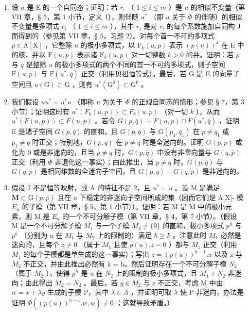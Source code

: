 \begin{enumerate}
\def\labelenumi{\alph{enumi})}
\item
  设 \(u\) 是 E 的一个自同态；证明：若 \(r_i\) （ \(1 \leqslant i \leqslant m\) ）是 \(u\) 的相似不变量（第 VII 章，§ 5，第 1 小节，定义 1），则伴随 \(u^*\) （即 \(u\) 关于 \(\Phi\) 的伴随）的相似不变量是多项式 \(\bar{r}_i\) （ \(1 \leqslant i \leqslant m\) ），其中 \(\bar{r}_i\) 是对 \(r_i\) 的每个系数施加自同构 J 而得到的（参见第 VII 章，§ 5，习题 2）。对每个首一不可约多项式 \(p \in \mathrm{A}[\mathrm{X}]\) ，它整除 \(u\) 的极小多项式，以 \(\mathrm{F}_k(u, p)\) 表示 \((p(u))^k\) 在 E 中的核，并以 \(\mathrm{F}(u, p)\) 表示诸 \(\mathrm{F}_k(u, p)\) 对一切整数 \(k > 0\) 的并。证明：若 \(p\) 与 \(q\) 是整除 \(u\) 的极小多项式的两个不同的首一不可约多项式，则子空间 \(\mathrm{F}(u, p)\) 与 \(\mathrm{F}(u^*, \bar{q})\) 正交（利用贝祖恒等式）。最后，若 G 是 E 的向量子空间且 \(u(\mathrm{G}) \subset \mathrm{G}\) ，则有 \(u^*(\mathrm{G}^0) \subset \mathrm{G}^0\) 。
\item
  我们假设 \(uu^{*} = u^{*}u\) （即称 \(u\) 为关于 \(\Phi\) 的正规自同态的情形；参见 § 7，第 3 小节）；证明这时有 \(u^{*}(F_{k}(u,p)) \subset F_{k}(u,p)\) （对一切 \(k\) ），从而 \(u^{*}(F(u,p)) \subset F(u,p)\) 。若令 \(G(p,\bar{q}) = F(u,p) \cap F(u^{*},\bar{q})\) ，证明 E 是诸子空间 \(G(p,\bar{q})\) 的直和，且 \(G(p,\bar{q})\) 与 \(G(p_{1},\bar{q}_{1})\) 在 \(p \neq q_{1}\) 或 \(p_{1} \neq q\) 时正交；特别地，\(G(p,\bar{q})\) 在 \(p \neq q\) 时是全迷向的。证明 \(G(p,\bar{p})\) 或化为 0 或是非迷向的，且当 \(p \neq q\) 时，\(G(p,\bar{q})\) 中没有非零向量与 \(G(q,\bar{p})\) 正交（利用 \(\Phi\) 非退化这一事实）；由此推出，当 \(p \neq q\) 时，\(G(p,\bar{q})\) 与 \(G(q,\bar{p})\) 是相同维数的全迷向子空间，且 \(G(p,\bar{q}) + G(q,\bar{p})\) 是非迷向的。
\item
  假设 J 不是恒等映射，或 A 的特征不是 2，且 \(u^{*} = u\) 。设 M 是满足 \(\mathbf{M} \subset \mathrm{G}(p, \overline{p})\) 且在 \(u\) 下稳定的非迷向子空间所成的集（因而它们是 A{[}X{]}- 模 \(E_{u}\) 的子模（第 VII 章，§ 5，第 1 小节））。证明：若 M 是 M 中的极小元素，则 M 是 \(E_{u}\) 的一个不可分解子模（第 VII 章，§ 4，第 7 小节）。（假设 M 是一个不可分解子模 \(M_{1}\) 与一个子模 \(M_{2} \neq \{0\}\) 的直和，极小多项式 \(p^{h}\) 与 \(p^{k}\) （分别为 u 在 \(M_{1}\) 与 \(M_{2}\) 上的限制的）满足 \(h \geqslant k\) 。注意此时 \(M_{1}\) 必然是迷向的，且每个 \(z \neq 0\) （属于 \(M_{1}\) 且使 \(p(u).z = 0\) ）都与 \(M_{1}\) 正交（利用 \(M_{1}\) 的每个子模都是单生成的这一事实）；写出 \(z = (p(u))^{h-1}.x\) 以及 z 与 \(M_{2}\) 不正交，并由此推出必然有 k = h。然后证明存在一个不可分解子模 \(N_{2}\) （属于 \(M_{2}\) ），使得 \(p^{h}\) 是 u 在 \(N_{2}\) 上的限制的极小多项式，且 \(M_{1} + N_{2}\) 非迷向；由此得出 \(M_{2} = N_{2}\) 。最后，若 \(y \in M_{2}\) 与 z 不正交，考虑 M 中由 \(w = x + \lambda y\) 生成的子模 P，其中 \(\lambda \in A\) ，并证明可取 \(\lambda\) 使 P 非迷向，办法是证明 \(\Phi((p(u))^{h-1}.w,w) \neq 0\) ；这就导致矛盾。）
\end{enumerate}

